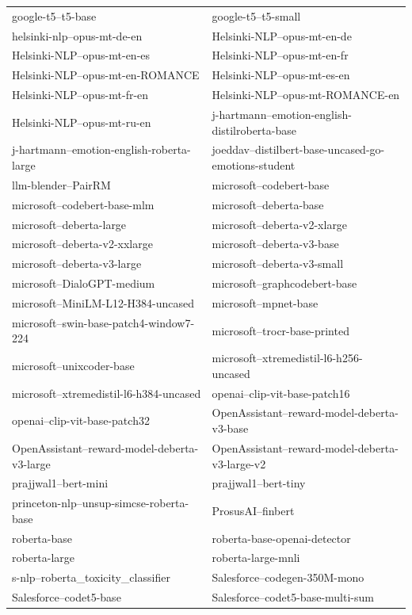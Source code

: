 \documentclass{fairmeta}
\begin{document}
\begin{longtable}{p{} p{}}
google-t5--t5-base & google-t5--t5-small \\
helsinki-nlp--opus-mt-de-en & Helsinki-NLP--opus-mt-en-de \\
Helsinki-NLP--opus-mt-en-es & Helsinki-NLP--opus-mt-en-fr \\
Helsinki-NLP--opus-mt-en-ROMANCE & Helsinki-NLP--opus-mt-es-en \\
Helsinki-NLP--opus-mt-fr-en & Helsinki-NLP--opus-mt-ROMANCE-en \\
Helsinki-NLP--opus-mt-ru-en & j-hartmann--emotion-english-distilroberta-base \\
j-hartmann--emotion-english-roberta-large & joeddav--distilbert-base-uncased-go-emotions-student \\
llm-blender--PairRM & microsoft--codebert-base \\
microsoft--codebert-base-mlm & microsoft--deberta-base \\
microsoft--deberta-large & microsoft--deberta-v2-xlarge \\
microsoft--deberta-v2-xxlarge & microsoft--deberta-v3-base \\
microsoft--deberta-v3-large & microsoft--deberta-v3-small \\
microsoft--DialoGPT-medium & microsoft--graphcodebert-base \\
microsoft--MiniLM-L12-H384-uncased & microsoft--mpnet-base \\
microsoft--swin-base-patch4-window7-224 & microsoft--trocr-base-printed \\
microsoft--unixcoder-base & microsoft--xtremedistil-l6-h256-uncased \\
microsoft--xtremedistil-l6-h384-uncased & openai--clip-vit-base-patch16 \\
openai--clip-vit-base-patch32 & OpenAssistant--reward-model-deberta-v3-base \\
OpenAssistant--reward-model-deberta-v3-large & OpenAssistant--reward-model-deberta-v3-large-v2 \\
prajjwal1--bert-mini & prajjwal1--bert-tiny \\
princeton-nlp--unsup-simcse-roberta-base & ProsusAI--finbert \\
roberta-base & roberta-base-openai-detector \\
roberta-large & roberta-large-mnli \\
s-nlp--roberta\_toxicity\_classifier & Salesforce--codegen-350M-mono \\
Salesforce--codet5-base & Salesforce--codet5-base-multi-sum \\

\end{longtable}
\end{document}
